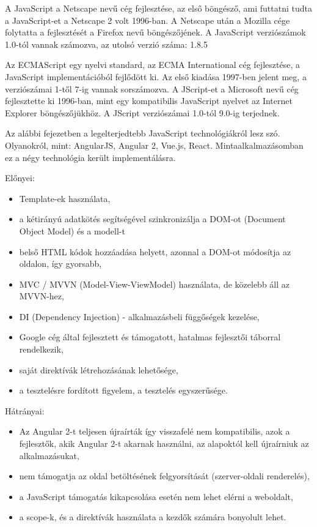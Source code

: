 A JavaScript a Netscape nevű cég fejlesztése, az első böngésző, ami futtatni tudta a JavaScript-et a Netscape 2 volt 1996-ban. A Netscape után a Mozilla cége folytatta a fejlesztését a Firefox nevű böngészőjének. A JavaScript verziószámok 1.0-tól vannak számozva, az utolsó verzió száma: 1.8.5

Az ECMAScript egy nyelvi standard, az ECMA International cég fejlesztése, a JavaScript implementációból fejlődött ki. Az első kiadása 1997-ben jelent meg, a verziószámai 1-től 7-ig vannak sorszámozva.
A JScript-et a Microsoft nevű cég fejlesztette ki 1996-ban, mint egy kompatibilis JavaScript nyelvet az Internet Explorer böngészőjükhöz. A JScript verziószámai 1.0-tól 9.0-ig terjednek.


Az alábbi fejezetben a legelterjedtebb JavaScript technológiákról lesz szó. Olyanokról, mint: AngularJS, Angular 2, Vue.js, React. Mintaalkalmazásomban ez a négy technológia került implementálásra.


Előnyei:

\begin{itemize}
\item Template-ek használata, 
\item a kétirányú adatkötés segítségével szinkronizálja a DOM-ot (Document Object Model) és a modell-t
\item belső HTML kódok hozzáadása helyett, azonnal a DOM-ot módosítja az oldalon, így gyorsabb, 
\item MVC / MVVN (Model-View-ViewModel) használata, de közelebb áll az MVVN-hez,
\item DI (Dependency Injection) - alkalmazásbeli függőségek kezelése,
\item Google cég által fejlesztett és támogatott, hatalmas fejlesztői táborral rendelkezik,
\item saját direktívák létrehozásának lehetősége,
\item a tesztelésre fordított figyelem, a tesztelés egyszerűsége.
\end{itemize}

Hátrányai: 

\begin{itemize}
\item Az Angular 2-t teljesen újraírták így visszafelé nem kompatibilis, azok a fejlesztők, akik Angular 2-t akarnak használni, az alapoktól kell újraírniuk az alkalmazásukat,
\item nem támogatja az oldal betöltésének felgyorsítását (szerver-oldali renderelés),
\item a JavaScript támogatás kikapcsolása esetén nem lehet elérni a weboldalt,
\item a scope-k, és a direktívák használata a kezdők számára bonyolult lehet. \cite{AngularJS}
\end{itemize}

